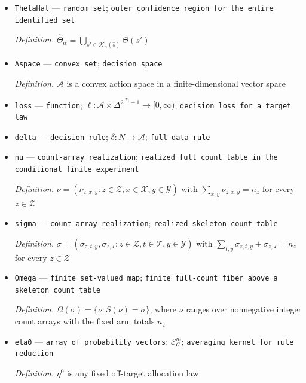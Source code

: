 \documentclass{article}
\begin{document}
\begin{itemize}
  \par\smallskip\noindent\emph{Definition.} \(\mathcal K_\alpha(\widehat s)=\{s'\in\mathcal S:D_{\mathrm{KL}}(\widehat s_z\|s'_z)\le\rho_z(\alpha)\text{ for every }z\in\mathcal Z\}\)
  \item \texttt{ThetaHat} --- \texttt{random set}; \texttt{outer confidence region for the entire identified set}
  \par\smallskip\noindent\emph{Definition.} \(\widehat\Theta_\alpha=\bigcup_{s'\in\mathcal K_\alpha(\widehat s)}\Theta(s')\)
  \item \texttt{Aspace} --- \texttt{convex set}; \texttt{decision space}
  \par\smallskip\noindent\emph{Definition.} \(\mathcal A\) is a convex action space in a finite-dimensional vector space
  \item \texttt{loss} --- \texttt{function}; \(\ell:\mathcal A\times\Delta^{2^{|\mathcal T|}-1}\to[0,\infty)\); \texttt{decision loss for a target law}
  \item \texttt{delta} --- \texttt{decision rule}; \(\delta:N\mapsto\mathcal A\); \texttt{full-\allowbreak{}data rule}
  \item \texttt{nu} --- \texttt{count-\allowbreak{}array realization}; \texttt{realized full count table in the conditional finite experiment}
  \par\smallskip\noindent\emph{Definition.} \(\nu=(\nu_{z,x,y}:z\in\mathcal Z,x\in\mathcal X,y\in\mathcal Y)\) with \(\sum_{x,y}\nu_{z,x,y}=n_z\) for every \(z\in\mathcal Z\)
  \item \texttt{sigma} --- \texttt{count-\allowbreak{}array realization}; \texttt{realized skeleton count table}
  \par\smallskip\noindent\emph{Definition.} \(\sigma=(\sigma_{z,t,y},\sigma_{z,\star}:z\in\mathcal Z,t\in\mathcal T,y\in\mathcal Y)\) with \(\sum_{t,y}\sigma_{z,t,y}+\sigma_{z,\star}=n_z\) for every \(z\in\mathcal Z\)
  \item \texttt{Omega} --- \texttt{finite set-\allowbreak{}valued map}; \texttt{finite full-\allowbreak{}count fiber above a skeleton count table}
  \par\smallskip\noindent\emph{Definition.} \(\Omega(\sigma)=\{\nu:S(\nu)=\sigma\}\), where \(\nu\) ranges over nonnegative integer count arrays with the fixed arm totals \(n_z\)
  \item \texttt{eta0} --- \texttt{array of probability vectors}; \(\mathcal E_{\mathcal C}^{m}\); \texttt{averaging kernel for rule reduction}
  \par\smallskip\noindent\emph{Definition.} \(\eta^0\) is any fixed off-target allocation law

\end{itemize}
\end{document}
